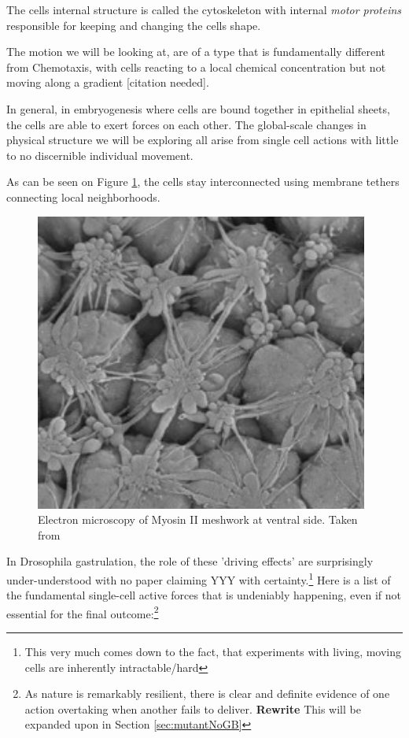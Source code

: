 The cells internal structure is called the cytoskeleton with internal \textit{motor proteins} responsible for keeping and changing the cells shape.

The motion we will be looking at, are of a type that is fundamentally different from Chemotaxis, with cells reacting to a local chemical concentration but not moving along a gradient [citation needed].

In general, in embryogenesis where cells are bound together in epithelial sheets, the cells are able to exert forces on each other. 
The global-scale changes in physical structure we will be exploring all arise from single cell actions with little to no discernible individual movement.

As can be seen on Figure \ref{fig:mysosinMeshwork}, the cells stay interconnected using membrane tethers connecting local neighborhoods. 

\begin{figure}[H]
    \centering
    \includegraphics[width=0.6\linewidth]{chapters/Theory/figures/EM_constricting_proteins.png}
    \caption{Electron microscopy of Myosin II meshwork at ventral side. Taken from }
    \label{fig:mysosinMeshwork}
\end{figure}

In Drosophila gastrulation, the role of these 'driving effects' are surprisingly under-understood with no paper claiming YYY with certainty.\footnote{This very much comes down to the fact, that experiments with living, moving cells are inherently intractable/hard} Here is a list of the fundamental single-cell active forces that is undeniably happening, even if not essential for the final outcome:\footnote{As nature is remarkably resilient, there is clear and definite evidence of one action overtaking when another fails to deliver. \textbf{Rewrite} This will be expanded upon in Section \ref{sec:mutantNoGB}} 

